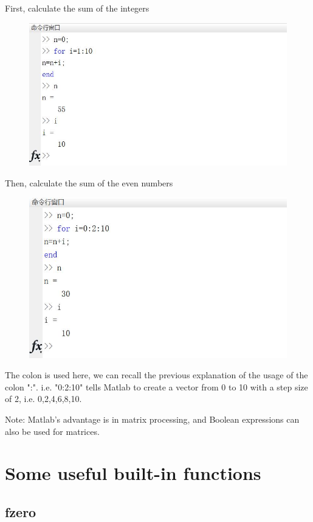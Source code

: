 \documentclass[10pt,math=newtx,citestyle=gb7714-2015,bibstyle=gb7714-2015]{elegantbook}
\begin{document}
{{{\begin{enumerate}
	First, calculate the sum of the integers
		
		\begin{figure}[htbp!]
			\centering
			\includegraphics[width=0.8\linewidth]{FIG/vectorsum}
			\centering
		\end{figure}
	\end{enumerate}
	
Then, calculate the sum of the even numbers
	
	\begin{figure}[htbp!]
		\centering
		\includegraphics[width=0.8\linewidth]{FIG/vectorevensum}
		\centering
	\end{figure}
	
	The colon is used here, we can recall the previous explanation of the usage of the colon ":". i.e. "0:2:10" tells Matlab to create a vector from 0 to 10 with a step size of 2, i.e. 0,2,4,6,8,10.
	
	Note: Matlab's advantage is in matrix processing, and Boolean expressions can also be used for matrices.
	
	\section{Some useful built-in functions}
	
	\subsection{fzero}
	
}}}
\end{document}

